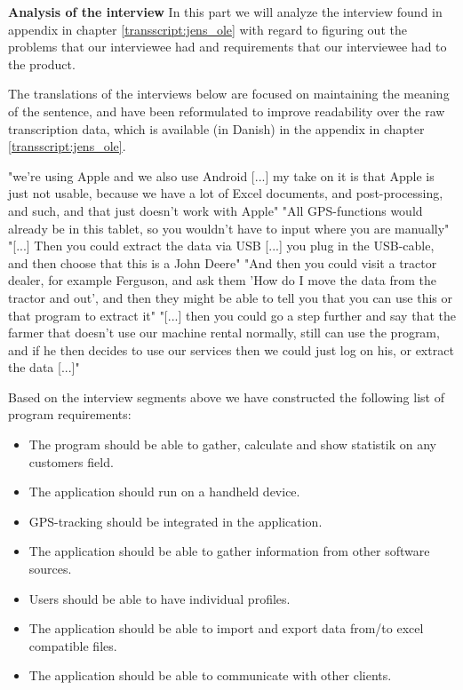 \textbf{Analysis of the interview}\label{interview_analysis}\newline
In this part we will analyze the interview found in appendix in chapter \ref{transscript:jens_ole} with regard to figuring out the problems that our interviewee had and requirements that our interviewee had to the product. 

The translations of the interviews below are focused on maintaining the meaning of the sentence, and have been reformulated to improve readability over the raw transcription data, which is available (in Danish) in the appendix in chapter \ref{transscript:jens_ole}.

"we're using Apple and we also use Android [...] my take on it is that Apple is just not usable, because we have a lot of Excel documents, and post-processing, and such, and that just doesn't work with Apple"\newline
"All GPS-functions would already be in this tablet, so you wouldn't have to input where you are manually"\newline
"[...] Then you could extract the data via USB [...] you plug in the USB-cable, and then choose that this is a John Deere"\newline
"And then you could visit a tractor dealer, for example Ferguson, and ask them 'How do I move the data from the tractor and out', and then they might be able to tell you that you can use this or that program to extract it"\newline
"[...] then you could go a step further and say that the farmer that doesn't use our machine rental normally, still can use the program, and if he then decides to use our services then we could just log on his, or extract the data [...]"\newline

Based on the interview segments above we have constructed the following list of program requirements:
\begin{itemize}[noitemsep]
    \item The program should be able to gather, calculate and show statistik on any customers field.
    \item The application should run on a handheld device.
    \item GPS-tracking should be integrated in the application.
    \item The application should be able to gather information from other software sources.
    \item Users should be able to have individual profiles.
    \item The application should be able to import and export data from/to excel compatible files.
    \item The application should be able to communicate with other clients.
\end{itemize}

